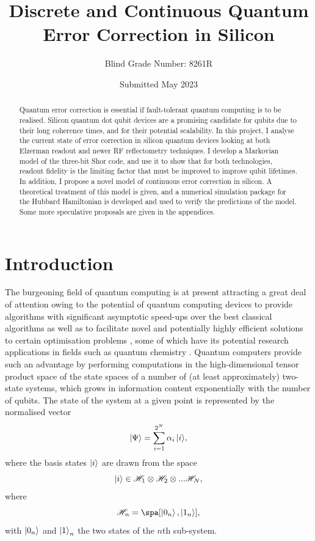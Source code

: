 \documentclass{report}
\title{Discrete and Continuous Quantum Error Correction in Silicon}
\author{Blind Grade Number: 8261R}
\date{Submitted May 2023}
\begin{document}

\begin{abstract}
    Quantum error correction is essential if fault-tolerant quantum computing is to be realised. Silicon quantum dot qubit devices are a promising candidate for qubits due to their long coherence times, and for their potential scalability. In this project, I analyse the current state of error correction in silicon quantum devices looking at both Elzerman readout and newer RF reflectometry techniques. I develop a Markovian model of the three-bit Shor code, and use it to show that for both technologies, readout fidelity is the limiting factor that must be improved to improve qubit lifetimes. In addition, I propose a novel model of continuous error correction in silicon. A theoretical treatment of this model is given, and a numerical simulation package for the Hubbard Hamiltonian is developed and used to verify the predictions of the model. Some more speculative proposals are given in the appendices.
\end{abstract}
\restoregeometry
\tableofcontents

\chapter{Introduction}
The burgeoning field of quantum computing is at present attracting a great deal of attention owing to the potential of quantum computing devices to provide algorithms with significant asymptotic speed-ups over the best classical algorithms \cite{shor_1997} as well as to facilitate novel and potentially highly efficient solutions to certain optimisation problems \cite{tilly_2022}, some of which have its potential research applications in fields such as quantum chemistry \cite{cao_2019}. Quantum computers provide such an advantage by performing computations in the high-dimensional tensor product space of the state spaces of a number of (at least approximately) two-state systems, which grows in information content exponentially with the number of qubits. The state of the system at a given point is represented by the normalised vector 
\begin{equation*}
    \ket{\Psi} = \sum_{i = 1}^{2^N}{\alpha_i \ket{i}},
\end{equation*}
where the basis states $\ket{i}$ are drawn from the space
\begin{equation*}
    \ket{i} \in \mathscr{H}_1 \otimes \mathscr{H}_2 \otimes ... \mathscr{H}_N,
\end{equation*}
where
\begin{equation*}
    \mathscr{H}_n = \spa[\ket{0_n},\ket{1_n}],
\end{equation*} with $\ket{0_n}$ and $\ket{1}_n$ the two states of the $n$th sub-system.
\end{document}
